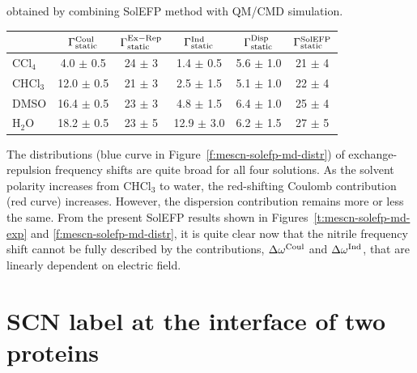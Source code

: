 \documentclass[a4paper,titlepage,twoside,fleqn,12pt]{book}
\begin{document}
\begin{refsection}
\begin{table}[t!]
{obtained by combining SolEFP method with QM/CMD simulation.
\label{t:mescn-solefp-md-fwhm}}
\begin{tabular*}{1.0\textwidth}{@{\extracolsep{\fill} } l ccccc}
\hline\hline
  & $\Gamma^{\rm Coul}_{\rm static}$
  & $\Gamma^{\rm Ex-Rep}_{\rm static}$
  & $\Gamma^{\rm Ind}_{\rm static}$
  & $\Gamma^{\rm Disp}_{\rm static}$
  & $\Gamma^{\rm SolEFP}_{\rm static}$ \\
\hline
CCl$_4$            &  4.0 $\pm$ 0.5 & 24 $\pm$ 3 & 1.4 $\pm$ 0.5 & 5.6 $\pm$ 1.0 & 21 $\pm$ 4   \\
CHCl$_3$           & 12.0 $\pm$ 0.5 & 21 $\pm$ 3 & 2.5 $\pm$ 1.5 & 5.1 $\pm$ 1.0 & 22 $\pm$ 4   \\
DMSO               & 16.4 $\pm$ 0.5 & 23 $\pm$ 3 & 4.8 $\pm$ 1.5 & 6.4 $\pm$ 1.0 & 25 $\pm$ 4   \\
H$_2$O             & 18.2 $\pm$ 0.5 & 23 $\pm$ 5 & 12.9 $\pm$ 3.0& 6.2 $\pm$ 1.5 & 27 $\pm$ 5   \\
\hline\hline
\end{tabular*}
%
\end{table}
%
The distributions
(blue curve in Figure~\ref{f:mescn-solefp-md-distr}) 
of exchange\hyp{}repulsion frequency shifts
are quite broad for all four solutions. As the solvent polarity
increases from CHCl$_3$ to water, the red\hyp{}shifting Coulomb
contribution (red curve) increases. However, the dispersion
contribution remains more or less the same. From the present
SolEFP results shown in Figures~\ref{t:mescn-solefp-md-exp} 
and \ref{f:mescn-solefp-md-distr}, it is quite clear now
that the nitrile frequency shift cannot be fully described by the
contributions, $\Delta\omega^{\rm Coul}$ and $\Delta\omega^{\rm Ind}$, 
that are linearly dependent on
electric field.



\section{SCN label at the interface of two proteins}


\end{refsection}
\end{document}

